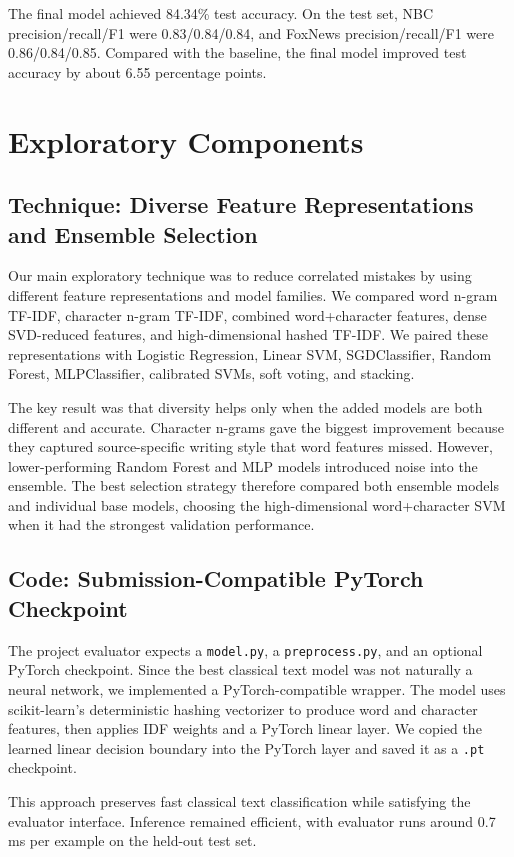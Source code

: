 \documentclass[10pt]{article}
\begin{document}
The final model achieved 84.34\% test accuracy. On the test set, NBC precision/recall/F1 were 0.83/0.84/0.84, and FoxNews precision/recall/F1 were 0.86/0.84/0.85. Compared with the baseline, the final model improved test accuracy by about 6.55 percentage points.

\section{Exploratory Components}

\subsection{Technique: Diverse Feature Representations and Ensemble Selection}
Our main exploratory technique was to reduce correlated mistakes by using different feature representations and model families. We compared word n-gram TF-IDF, character n-gram TF-IDF, combined word+character features, dense SVD-reduced features, and high-dimensional hashed TF-IDF. We paired these representations with Logistic Regression, Linear SVM, SGDClassifier, Random Forest, MLPClassifier, calibrated SVMs, soft voting, and stacking.

The key result was that diversity helps only when the added models are both different and accurate. Character n-grams gave the biggest improvement because they captured source-specific writing style that word features missed. However, lower-performing Random Forest and MLP models introduced noise into the ensemble. The best selection strategy therefore compared both ensemble models and individual base models, choosing the high-dimensional word+character SVM when it had the strongest validation performance.

\subsection{Code: Submission-Compatible PyTorch Checkpoint}
The project evaluator expects a \texttt{model.py}, a \texttt{preprocess.py}, and an optional PyTorch checkpoint. Since the best classical text model was not naturally a neural network, we implemented a PyTorch-compatible wrapper. The model uses scikit-learn's deterministic hashing vectorizer to produce word and character features, then applies IDF weights and a PyTorch linear layer. We copied the learned linear decision boundary into the PyTorch layer and saved it as a \texttt{.pt} checkpoint.

This approach preserves fast classical text classification while satisfying the evaluator interface. Inference remained efficient, with evaluator runs around 0.7 ms per example on the held-out test set.
\end{document}
